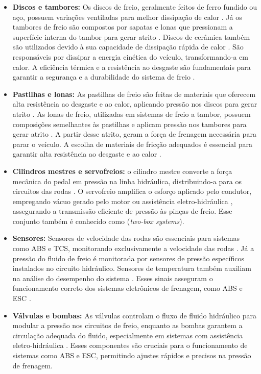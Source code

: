 \begin{itemize}
    \item \textbf{Discos e tambores:} Os discos de freio, geralmente feitos de ferro fundido ou aço, possuem variações ventiladas para melhor dissipação de calor \cite{Konrad2014}. Já os tambores de freio são compostos por sapatas e lonas que pressionam a superfície interna do tambor para gerar atrito \cite{Konrad2014}.
          Discos de cerâmica também são utilizados devido à sua capacidade de dissipação rápida de calor \cite{Lentin2022}.
          São responsáveis por dissipar a energia cinética do veículo, transformando-a em calor. A eficiência térmica e a resistência ao desgaste são fundamentais para garantir a segurança e a durabilidade do sistema de freio \cite{Rudolf2011, AndrewJ2022}.
    \item \textbf{Pastilhas e lonas:} As pastilhas de freio são feitas de materiais que oferecem alta resistência ao desgaste e ao calor, aplicando pressão nos discos para gerar atrito \cite{Konrad2014, Lentin2022}. As lonas de freio, utilizadas em sistemas de freio a tambor, possuem composições semelhantes às pastilhas e aplicam pressão nos tambores para gerar atrito \cite{Konrad2014, Lentin2022}.
    A partir desse atrito, geram a força de frenagem necessária para parar o veículo. A escolha de materiais de fricção adequados é essencial para garantir alta resistência ao desgaste e ao calor \cite{Konrad2014, AndrewJ2022}.
    \item \textbf{Cilindros mestres e servofreios:} o cilindro mestre converte a força mecânica do pedal em pressão na linha hidráulica, distribuindo-a para os circuitos das rodas \cite{Konrad2014, Lentin2022}. O servofreio amplifica o esforço aplicado pelo condutor, empregando vácuo gerado pelo motor ou assistência eletro-hidráulica \cite{Konrad2014}, assegurando a transmissão eficiente de pressão às pinças de freio. Esse conjunto também é conhecido como (\textit{two-box systems}).
    \item \textbf{Sensores:} Sensores de velocidade das rodas são essenciais para sistemas como ABS e TCS, monitorando exclusivamente a velocidade das rodas \cite{Konrad2014, Lentin2022, AndrewJ2022}. Já a pressão do fluido de freio é monitorada por sensores de pressão específicos instalados no circuito hidráulico. Sensores de temperatura também auxiliam na análise do desempenho do sistema \cite{Konrad2014}. Esses sinais asseguram o funcionamento correto dos sistemas eletrônicos de frenagem, como ABS e ESC \cite{Konrad2014, AndrewJ2022}.
    \item \textbf{Válvulas e bombas:} As válvulas controlam o fluxo de fluido hidráulico para modular a pressão nos circuitos de freio, enquanto as bombas garantem a circulação adequada do fluido, especialmente em sistemas com assistência eletro-hidráulica \cite{Konrad2014, Lentin2022}. Esses componentes são cruciais para o funcionamento de sistemas como ABS e ESC, permitindo ajustes rápidos e precisos na pressão de frenagem.

\end{itemize}
